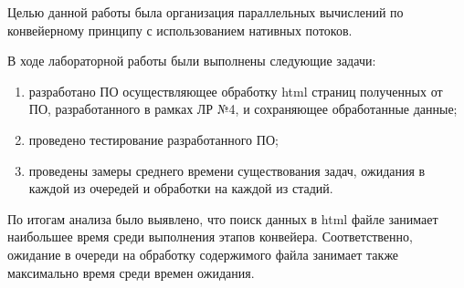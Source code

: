 
Целью данной работы была организация параллельных вычислений по конвейерному принципу с использованием нативных потоков.

В ходе лабораторной работы были выполнены следующие задачи:
\begin{enumerate}[label={\arabic*)}]
	\item разработано ПО осуществляющее обработку html страниц полученных от ПО, разработанного в рамках ЛР №4, и сохраняющее обработанные данные;
	\item проведено тестирование разработанного ПО;
	\item проведены замеры среднего времени существования задач, ожидания в каждой из очередей и обработки на каждой из стадий.
\end{enumerate}

По итогам анализа было выявлено, что поиск данных в html файле занимает наибольшее время среди выполнения этапов конвейера. Соответственно, ожидание в очереди на обработку содержимого файла занимает также максимально время среди времен ожидания.